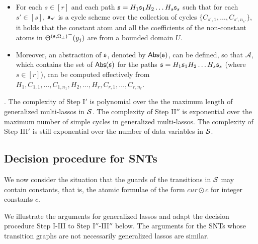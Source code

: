 \begin{itemize}
\item For each $s \in [r]$ and each path ${\mathfrak{s} }=H_1 {\mathfrak{s} }_1 H_2 \dots H_s {\mathfrak{s} }_s$ such that for each $s'\in [s]$, ${\mathfrak{s} }_{s'}$ is a cycle scheme over the collection of cycles $\{C_{s',1},\dots,C_{s',n_{s'}}\}$, it holds that the constant atom and all the coefficients of the non-constant atoms in ${\Theta^{({\mathfrak{s} },\Omega_\bot)}}^-(y_j)$ are from a bounded domain $U$.
%
\item Moreover,  an abstraction of ${\mathfrak{s} }$, denoted by $\mathsf{Abs}({\mathfrak{s} })$, can be defined, so that $\mathscr{A}$, which contains the set of $\mathsf{Abs}({\mathfrak{s} })$ for the paths ${\mathfrak{s} }=H_1 {\mathfrak{s} }_1 H_2 \dots H_s {\mathfrak{s} }_s$ (where $s \in [r]$), can be computed effectively from 
$H_1, C_{1,1}, \dots, C_{1,n_1},H_2,\dots, H_r,C_{r,1},\dots, C_{r,n_r}$.
\end{itemize}
\bigskip

. The complexity of Step I$'$ is polynomial over the the maximum length of generalized multi-lassos in ${\mathcal{S} }$. The complexity of Step II$''$ is exponential over the maximum number of simple cycles in generalized multi-lassos. The complexity of Step III$'$ is still exponential over the number of data variables in ${\mathcal{S} }$.

\subsection{Decision procedure for SNTs}

We now consider the situation that the guards of the transitions in ${\mathcal{S} }$ may contain constants, that is, the atomic formulae of the form $cur \odot c$ for integer constants $c$. 

We illustrate the arguments for generalized lassos and adapt the decision procedure Step I-III to Step I$''$-III$''$ below. The arguments for the SNTs whose transition graphs are not necessarily generalized lassos are similar.

